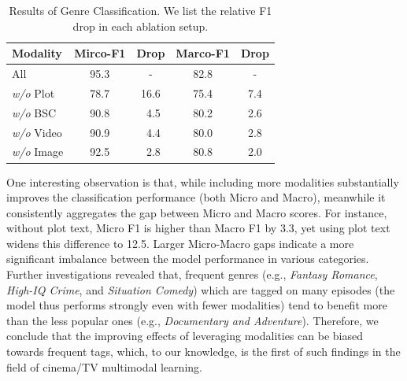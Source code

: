 \begin{table}
\centering
\scriptsize
\begin{tabular}{lcccc}
\toprule
\textbf{Modality} & \textbf{Mirco-F1} & \textbf{Drop} & \textbf{Marco-F1} & \textbf{Drop} \\
\midrule
All & 95.3 & - & 82.8 & - \\
\textit{w/o} Plot & 78.7 & 16.6 & 75.4 & 7.4 \\
\textit{w/o} BSC & 90.8 & \textcolor{white}{0}4.5 & 80.2 & 2.6 \\
\textit{w/o} Video & 90.9 & \textcolor{white}{0}4.4 & 80.0 & 2.8 \\
\textit{w/o} Image & 92.5 & \textcolor{white}{0}2.8 & 80.8 & 2.0 \\
\bottomrule
\end{tabular}
\caption{Results of Genre Classification. We list the relative F1 drop in each ablation setup.}
\label{tab:ablation_genre_cls}
\end{table}



One interesting observation is that, while including more modalities substantially improves the classification performance (both Micro and Macro), meanwhile it consistently aggregates the gap between Micro and Macro scores. For instance, without plot text, Micro F1 is higher than Macro F1 by 3.3, yet using plot text widens this difference to 12.5. Larger Micro-Macro gaps indicate a more significant imbalance between the model performance in various categories. Further investigations revealed that, frequent genres (e.g., \textit{Fantasy Romance}, \textit{High-IQ Crime}, and \textit{Situation Comedy}) which are tagged on many episodes (the model thus performs strongly even with fewer modalities) tend to benefit more than the less popular ones (e.g., \textit{Documentary and Adventure}). Therefore, we conclude that the improving effects of leveraging modalities can be biased towards frequent tags, which, to our knowledge, is the first of such findings in the field of cinema/TV multimodal learning.



